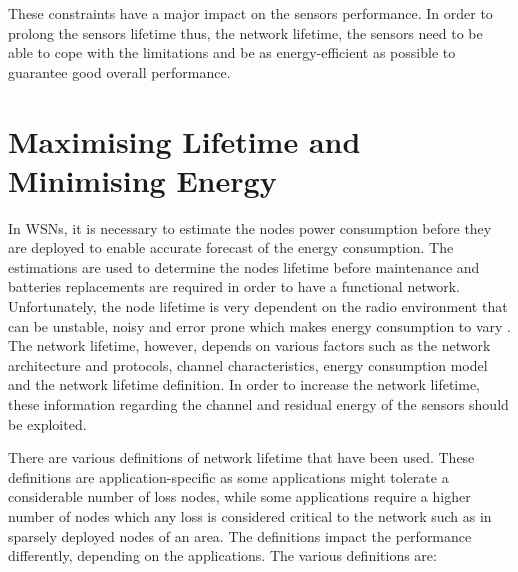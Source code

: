 These constraints have a major impact on the sensors performance. In order to prolong the sensors lifetime thus, the network lifetime, the sensors need to be able to cope with the limitations and be as energy-efficient as possible to guarantee good overall performance.

\section{Maximising Lifetime and Minimising Energy}
In WSNs, it is necessary to estimate the nodes power consumption before they are deployed to enable accurate forecast of the energy consumption. The estimations are used to determine the nodes lifetime before maintenance and batteries replacements are required in order to have a functional network. Unfortunately, the node lifetime is very dependent on the radio environment that can be unstable, noisy and error prone which makes energy consumption to vary \cite{alexlifetime}. The network lifetime, however, depends on various factors such as the network architecture and protocols, channel characteristics, energy consumption model and the network lifetime definition. In order to increase the network lifetime, these information regarding the channel and residual energy of the sensors should be exploited.

There are various definitions of network lifetime that have been used. These definitions are application-specific as some applications might tolerate a considerable number of loss nodes, while some applications require a higher number of nodes which any loss is considered critical to the network such as in sparsely deployed nodes of an area. The definitions impact the performance differently, depending on the applications. The various definitions are:

